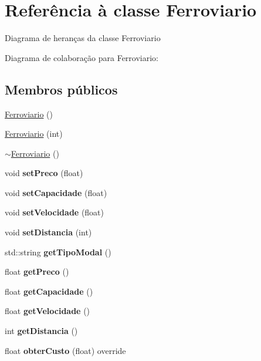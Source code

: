 \hypertarget{classFerroviario}{}\section{Referência à classe Ferroviario}
\label{classFerroviario}


Diagrama de heranças da classe Ferroviario


Diagrama de colaboração para Ferroviario\+:
\subsection*{Membros públicos}
\begin{DoxyCompactItemize}
\item 
\hyperlink{classFerroviario_ad9ab87f65b1e904a3fec909076f0a993}{Ferroviario} ()
\item 
\hyperlink{classFerroviario_a497cd242a790babb459821c59ff3678c}{Ferroviario} (int)
\item 
\hyperlink{classFerroviario_a14356b699e7cd2651654ef06029d2f0d}{$\sim$\+Ferroviario} ()
\item 
\mbox{\label{classFerroviario_a51c231a25084ce9bef1648642196b94e}} 
void {\bfseries set\+Preco} (float)
\item 
\mbox{\label{classFerroviario_aa40975457d7179ba75d5436251ca66e0}} 
void {\bfseries set\+Capacidade} (float)
\item 
\mbox{\label{classFerroviario_a773bb8838b8e651c5a59a196fd3df6be}} 
void {\bfseries set\+Velocidade} (float)
\item 
\mbox{\label{classFerroviario_a3015ee3389051f06e8bccbd70832ca4a}} 
void {\bfseries set\+Distancia} (int)
\item 
\mbox{\label{classFerroviario_a6d75f014c46c8c24ed2c121baa1cda0b}} 
std\+::string {\bfseries get\+Tipo\+Modal} ()
\item 
\mbox{\label{classFerroviario_a2face4e080b96591614237d88bda094c}} 
float {\bfseries get\+Preco} ()
\item 
\mbox{\label{classFerroviario_a990ce4dac67327abd75d66f94bf5d358}} 
float {\bfseries get\+Capacidade} ()
\item 
\mbox{\label{classFerroviario_a643ac2394764eb83835e63088f116ac4}} 
float {\bfseries get\+Velocidade} ()
\item 
\mbox{\label{classFerroviario_a80ae820b1f0e8cffd0063c332404c765}} 
int {\bfseries get\+Distancia} ()
\item 
\mbox{\label{classFerroviario_a691452311fe49e6573e47220fa372d15}} 
float {\bfseries obter\+Custo} (float) override
\end{DoxyCompactItemize}
